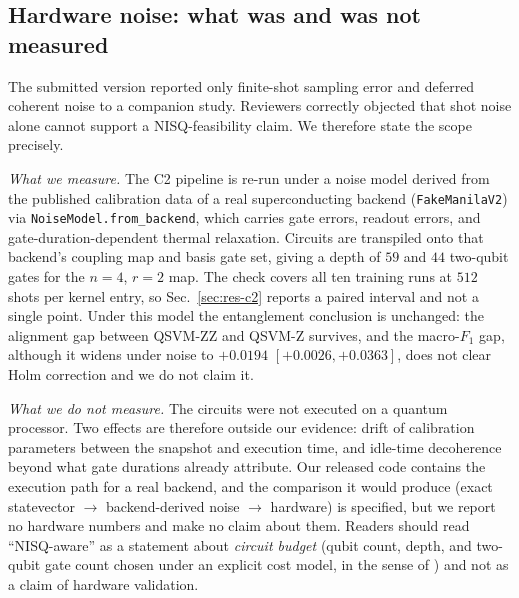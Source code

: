 \subsection{Hardware noise: what was and was not measured}
\begin{revbody}

The submitted version reported only finite-shot sampling error and deferred
coherent noise to a companion study. Reviewers correctly objected that shot
noise alone cannot support a NISQ-feasibility claim. We therefore state the
scope precisely.

\emph{What we measure.} The C2 pipeline is re-run under a noise model derived
from the published calibration data of a real superconducting backend
(\texttt{FakeManilaV2}) \cite{ref27} via \texttt{NoiseModel.from\_backend}, which
carries gate errors, readout errors, and gate-duration-dependent thermal
relaxation.
Circuits are transpiled onto that backend's coupling map and basis gate set,
giving a depth of $59$ and $44$ two-qubit gates for the $n=4$, $r=2$ map.
The check covers all ten training runs at $512$ shots per kernel entry, so
Sec.~\ref{sec:res-c2} reports a paired interval and not a single point.
Under this model the entanglement conclusion is unchanged: the alignment gap
between QSVM-ZZ and QSVM-Z survives, and the macro-$F_1$ gap, although it
widens under noise to $+0.0194$ $[+0.0026,+0.0363]$, does not clear Holm
correction and we do not claim it.

\emph{What we do not measure.} The circuits were not executed on a quantum
processor. Two effects are therefore outside our evidence: drift of calibration
parameters between the snapshot and execution time, and idle-time decoherence
beyond what gate durations already attribute. Our released code contains the
execution path for a real backend, and the comparison it would produce
(exact statevector $\rightarrow$ backend-derived noise $\rightarrow$ hardware)
is specified, but we report no hardware numbers and make no claim about them.
Readers should read ``NISQ-aware'' as a statement about \emph{circuit budget}
(qubit count, depth, and two-qubit gate count chosen under an explicit cost
model, in the sense of \cite{ref8}) and not as a claim of hardware validation.
\end{revbody}

